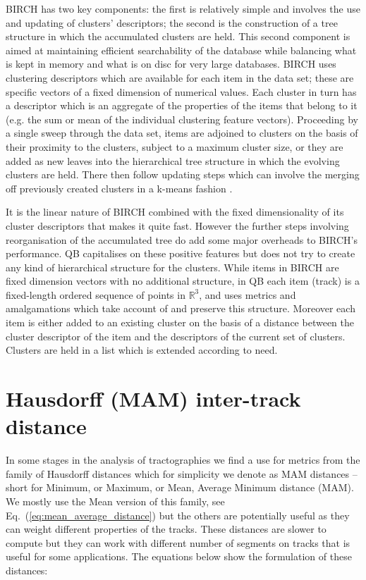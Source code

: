 \documentclass[preprint,authoryear,a4paper,10pt,onecolumn]{elsarticle}
\begin{document}
\begin{appendices}
BIRCH has two key components: the first is relatively simple and involves
the use and updating of clusters' descriptors; the second is the
construction of a tree structure in which the accumulated clusters are
held. This second component is aimed at maintaining efficient
searchability of the database while balancing what is kept in memory and
what is on disc for very large databases. BIRCH uses clustering
descriptors which are available for each item in the data set; these are
specific vectors of a fixed dimension of numerical values. Each cluster
in turn has a descriptor which is an aggregate of the properties of the
items that belong to it (e.g. the sum or mean of the individual
clustering feature vectors). Proceeding by a single sweep through the
data set, items are adjoined to clusters on the basis of their proximity
to the clusters, subject to a maximum cluster size, or they are added as
new leaves into the hierarchical tree structure in which the evolving
clusters are held. There then follow updating steps which can involve
the merging off previously created clusters in a k-means
fashion \citep{steinhaus1956division, macqueen1967some}.

It is the linear nature of BIRCH combined with the fixed dimensionality
of its cluster descriptors that makes it quite fast. However the further
steps involving reorganisation of the accumulated tree do add some major
overheads to BIRCH's performance. QB capitalises on these positive
features but does not try to create any kind of hierarchical structure
for the clusters. While items in BIRCH are fixed dimension vectors with
no additional structure, in QB each item (track) is a fixed-length
ordered sequence of points in $\mathbb{R}^{3}$, and uses metrics and
amalgamations which take account of and preserve this structure.
Moreover each item is either added to an existing cluster on the basis
of a distance between the cluster descriptor of the item and the
descriptors of the current set of clusters. Clusters are held in a list
which is extended according to need.

\section{Hausdorff (MAM) inter-track distance}

In some stages in the analysis of tractographies we find a use for
metrics from the family of Hausdorff distances which for simplicity we
denote as MAM distances -- short for Minimum, or Maximum, or Mean,
Average Minimum distance (MAM). We mostly use the Mean version of this
family, see Eq.~(\ref{eq:mean_average_distance}) but the others are
potentially useful as they can weight different properties of the
tracks. These distances are slower to compute but they can work with
different number of segments on tracks that is useful for some
applications. The equations below show the formulation of these
distances:


\end{appendices}
\end{document}
